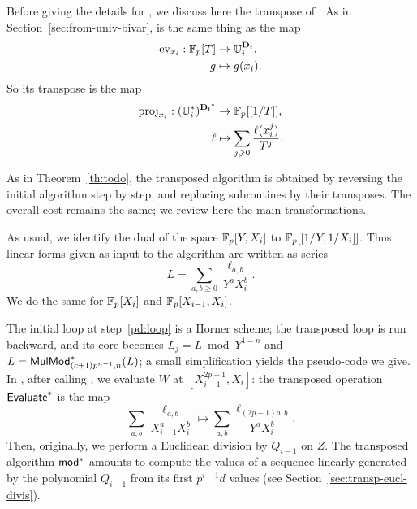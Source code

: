 Before giving the details for , we discuss here the
transpose of .  As in
Section~\ref{sec:from-univ-bivar},  is the same thing
as the map
\begin{equation}
  \label{eq:81}
  \begin{aligned}
    \operatorname{ev}_{x_i}:\mathbb{F}_p[T] &\rightarrow \mathbb{U}_i^{\mathbf{D}_i}\text{,}\\ 
    g&\mapsto g(x_i)\text{.}
  \end{aligned}
\end{equation}
So its transpose is the map
\begin{equation}
  \label{eq:82}
  \begin{aligned}
    \operatorname{proj}_{x_i}:(\mathbb{U}_i^\ast)^{\mathbf{D_i}^\ast}&\rightarrow\mathbb{F}_p[[1/T]]\text{,}\\
    \ell&\mapsto\sum_{j\geqslant0}\frac{\ell(x_i^j)}{T^j}\text{.}
  \end{aligned}
\end{equation}

As in Theorem~\ref{th:todo}, the transposed algorithm is obtained by
reversing the initial algorithm step by step, and replacing
subroutines by their transposes. The overall cost remains the same; we
review here the main transformations.

As usual, we identify the dual of the space $\mathbb{F}_p[Y,X_i]$ to
$\mathbb{F}_p[[1/Y,1/X_i]]$. Thus linear forms given as input to the algorithm
are written as series
\begin{equation}
  \label{eq:84}
  L=\sum_{a,b\ge0}\frac{\ell_{a,b}}{Y^aX_i^b}
  \text{.}
\end{equation}
We do the same for $\mathbb{F}_p[X_i]$ and $\mathbb{F}_p[X_{i-1},X_i]$.

The initial loop at step~\ref{pd:loop} is a Horner scheme; the
transposed loop is run backward, and its core becomes $L_j=L\bmod
Y^{1-n}$ and $L={\sf MulMod}_{(c+1)p^{n-1},n}^\ast(L)$; a small
simplification yields the pseudo-code we give.  In ,
after calling , we evaluate $W$ at
$[X_{i-1}^{2p-1},X_i]$: the transposed operation ${\sf
    Evaluate}^\ast$ is the map
\begin{equation}
  \label{eq:83}
  \sum_{a,b} \frac{\ell_{a,b}}{X_{i-1}^a X_i^b} \mapsto
  \sum_{a,b} \frac{\ell_{(2p-1)a,b}}{Y^a X_i^b}
  \text{.} 
\end{equation}
Then, originally, we perform a Euclidean division by $Q_{i-1}$ on
$Z$. The transposed algorithm
$\sf mod^\ast$ amounts to compute the values of a sequence linearly
generated by the polynomial $Q_{i-1}$ from its first $p^{i-1}d$ values
(see Section~\ref{sec:transp-eucl-divis}).


